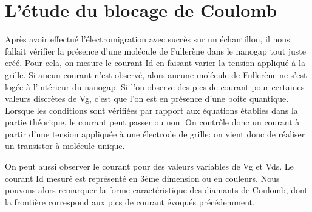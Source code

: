 \section{L'étude du blocage de Coulomb}
Après avoir effectué l'électromigration avec succès sur un échantillon, il nous fallait vérifier la présence d'une molécule de Fullerène dans le nanogap tout juste créé. Pour cela, on mesure le courant Id en faisant varier la tension appliqué à la grille. Si aucun courant n'est observé, alors aucune molécule de Fullerène ne s'est logée à l'intérieur du nanogap. Si l'on observe des pics de courant pour certaines valeurs discrètes de Vg, c'est que l'on est en présence d'une boite quantique. Lorsque les conditions sont vérifiées par rapport aux équations établies dans la partie théorique, le courant peut passer ou non. On contrôle donc un courant à partir d'une tension appliquée à une électrode de grille: on vient donc de réaliser un transistor à molécule unique.

On peut aussi observer le courant pour des valeurs variables de Vg et Vds. Le courant Id mesuré est représenté en 3ème dimension ou en couleurs. Nous pouvons alors remarquer la forme caractéristique des diamants de Coulomb, dont la frontière correspond aux pics de courant évoqués précédemment.
